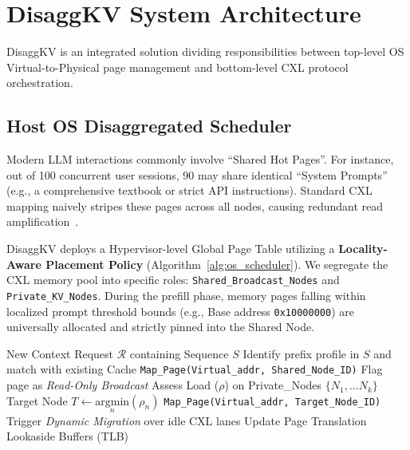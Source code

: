 \documentclass[10pt,conference]{IEEEtran}
\begin{document}
\section{DisaggKV System Architecture}

DisaggKV is an integrated solution dividing responsibilities between top-level OS Virtual-to-Physical page management and bottom-level CXL protocol orchestration.

\subsection{Host OS Disaggregated Scheduler}
Modern LLM interactions commonly involve ``Shared Hot Pages''. For instance, out of 100 concurrent user sessions, 90 may share identical ``System Prompts'' (e.g., a comprehensive textbook or strict API instructions). Standard CXL mapping naively stripes these pages across all nodes, causing redundant read amplification~\cite{vllm, splitwise}.

DisaggKV deploys a Hypervisor-level Global Page Table utilizing a \textbf{Locality-Aware Placement Policy} (Algorithm~\ref{alg:os_scheduler}). 
We segregate the CXL memory pool into specific roles: \texttt{Shared\_Broadcast\_Nodes} and \texttt{Private\_KV\_Nodes}. During the prefill phase, memory pages falling within localized prompt threshold bounds (e.g., Base address \texttt{0x10000000}) are universally allocated and strictly pinned into the Shared Node. 

\begin{algorithm}[t]
\caption{Host OS Disaggregated Allocation Policy}
\label{alg:os_scheduler}
\begin{algorithmic}[1]
\REQUIRE New Context Request $\mathcal{R}$ containing Sequence $S$
\STATE Identify prefix profile in $S$ and match with existing Cache
    \STATE \texttt{Map\_Page(Virtual\_addr, Shared\_Node\_ID)}
    \STATE Flag page as \textit{Read-Only Broadcast}
\ELSE
    \STATE Assess Load ($\rho$) on Private\_Nodes $\{N_1, \dots N_k\}$
    \STATE Target Node $T \leftarrow \underset{n}{\mathrm{argmin}}(\rho_n)$
    \STATE \texttt{Map\_Page(Virtual\_addr, Target\_Node\_ID)}
\ENDIF
{}
    \STATE Trigger \textit{Dynamic Migration} over idle CXL lanes
    \STATE Update Page Translation Lookaside Buffers (TLB)
\ENDIF
\end{algorithmic}
\end{algorithm}
\end{document}

